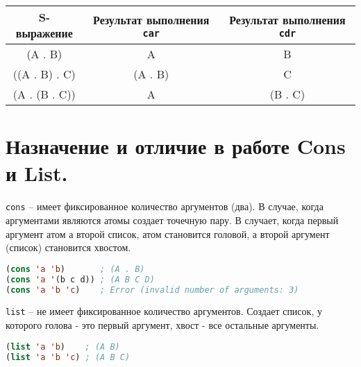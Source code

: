 \begin{center}
    \begin{tabular}{ |c|c|c| } 
        \hline
            S-выражение & Результат выполнения \texttt{car} & Результат выполнения \texttt{cdr} \\ 
        \hline
        \hline
            (A . B) & A & B \\ 
        \hline
            ((A . B) . C) & (A . B) & C \\ 
		\hline
			(A . (B . C)) & A & (B . C) \\ 
        \hline
    \end{tabular}
\end{center}


\section{Назначение и отличие в работе Cons и List.}

\texttt{cons} -- имеет фиксированное количество аргументов (два). 
В случае, когда аргументами являются атомы создает точечную пару. В случает, когда первый аргумент атом а второй список, атом становится головой, а второй аргумент (список) становится хвостом. 

\begin{lstlisting}[language=Lisp]
(cons 'a 'b) 	   ; (A . B)
(cons 'a '(b c d)) ; (A B C D)
(cons 'a 'b 'c)    ; Error (invalid number of arguments: 3)
\end{lstlisting}



\texttt{list} -- не имеет фиксированное количество аргументов. 
Создает список, у которого голова - это первый аргумент, хвост - все остальные аргументы.

\begin{lstlisting}[language=Lisp]
(list 'a 'b)    ; (A B)
(list 'a 'b 'c) ; (A B C)
\end{lstlisting}

